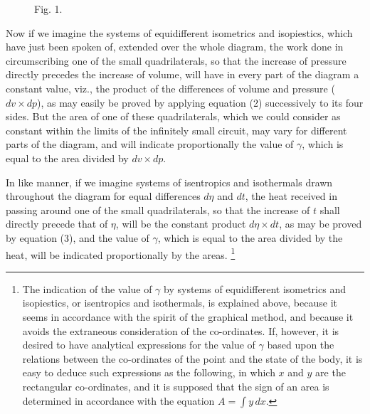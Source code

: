 \documentclass[11pt]{article}
\newcommand{\figlabel}[1]{\par\smallskip\centerline{\small #1}\smallskip}
\begin{document}
\begin{figure}[h]
\centering
{}
\figlabel{Fig. 1.}
\end{figure}

Now if we imagine the systems of equidifferent isometrics and isopiestics, which have just been spoken of, extended over the whole diagram, the work done in circumscribing one of the small quadrilaterals, so that the increase of pressure directly precedes the increase of volume, will have in every part of the diagram a constant value, viz., the product of the differences of volume and pressure ($dv\times dp$), as may easily be proved by applying equation (2) successively to its four sides. But the area of one of these quadrilaterals, which we could consider as constant within the limits of the infinitely small circuit, may vary for different parts of the diagram, and will indicate proportionally the value of $\gamma$, which is equal to the area divided by $dv\times dp$.

In like manner, if we imagine systems of isentropics and isothermals drawn throughout the diagram for equal differences $d\eta$ and $dt$, the heat received in passing around one of the small quadrilaterals, so that the increase of $t$ shall directly precede that of $\eta$, will be the constant product $d\eta\times dt$, as may be proved by equation (3), and the value of $\gamma$, which is equal to the area divided by the heat, will be indicated proportionally by the areas.
\footnote{The indication of the value of $\gamma$ by systems of equidifferent isometrics and isopiestics, or isentropics and isothermals, is explained above, because it seems in accordance with the spirit of the graphical method, and because it avoids the extraneous consideration of the co-ordinates. If, however, it is desired to have analytical expressions for the value of $\gamma$ based upon the relations between the co-ordinates of the point and the state of the body, it is easy to deduce such expressions as the following, in which $x$ and $y$ are the rectangular co-ordinates, and it is supposed that the sign of an area is determined in accordance with the equation $A=\int y\,dx$.}
\end{document}
